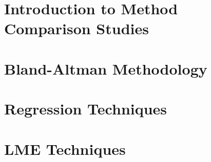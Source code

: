 \documentclass{report}
\begin{document}
\tableofcontents
\newpage
\chapter{Introduction to Method Comparison Studies}


\newpage
\chapter{Bland-Altman Methodology}




\newpage
\chapter{Regression Techniques}




\newpage
\chapter{LME Techniques}




\end{document}
